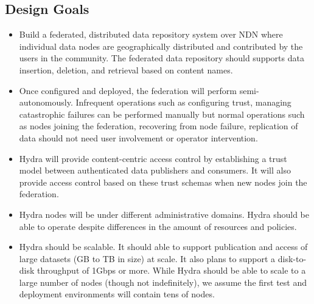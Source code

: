 \subsection{Design Goals} \label{subsec:design-goals}
\begin{itemize}
    \item Build a federated, distributed data repository system over NDN where individual data nodes are geographically distributed and contributed by the users in the community. The federated data repository should supports data insertion, deletion, and retrieval based on content names.
    \item Once configured and deployed, the federation will perform semi-autonomously. Infrequent operations such as configuring trust, managing catastrophic failures can be performed manually but normal operations such as nodes joining the federation, recovering from node failure, replication of data should not need user involvement or operator intervention.
    \item Hydra will provide content-centric access control by establishing a trust model between authenticated data publishers and consumers. It will also provide access control based on these trust schemas when new nodes join the federation.
    \item Hydra nodes will be under different administrative domains. Hydra should be able to operate despite differences in the amount of resources and policies.
    \item Hydra should be scalable. It should able to support publication and access of large datasets (GB to TB in size) at scale. It also plans to support a disk-to-disk throughput of 1Gbps or more. While Hydra should be able to scale to a large number of nodes (though not indefinitely), we assume the first test and deployment environments will contain tens of nodes. 
\end{itemize}
